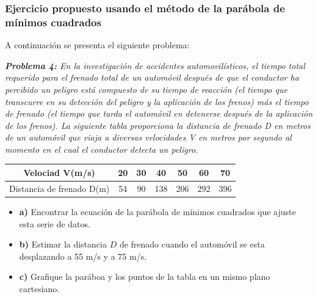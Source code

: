 \documentclass[11pt,letterpaper]{article}
\begin{document}
\subsubsection{Ejercicio propuesto usando el método de la parábola de mínimos cuadrados}
A continuación se presenta el siguiente problema:
\begin{center}
	\textit{\textbf{Problema 4:} En la investigación de accidentes automovilísticos, el tiempo total requerido para el frenado total de un automóvil después de que el conductor ha percibido un peligro está compuesto de su tiempo de reacción (el tiempo que transcurre en su detección del peligro y la aplicación de los frenos) más el tiempo de frenado (el tiempo que tarda el automóvil en detenerse después de la aplicación de los frenos). La siguiente tabla proporciona la distancia de frenado D en metros de un automóvil que viaja a diversas velocidades V en metros por segundo al momento en el cual el conductor detecta un peligro.}
	\linebreak\par
	\begin{tabular}{c| c c c c c c }
	\hline
		Velociad V(m/s) &   20 & 30 & 40 & 50 & 60 & 70 \\ 		\hline
		Distancia de frenado D(m) & 54 & 90 & 138 & 206 & 292 & 396 \\
		\hline
	\end{tabular}
	\begin{itemize}
		\item \textbf{a)} Encontrar la ecuación de la parábola de mínimos cuadrados que ajuste esta serie de datos.
		\item \textbf{b)} Estimar la distancia $D$ de frenado cuando el automóvil se esta desplazando a 55 m/s y a 75 m/s.
		\item \textbf{c)} Grafique la paráboa y los puntos de la tabla en un mismo plano cartesiano.
	\end{itemize}
\end{center}
\end{document}
